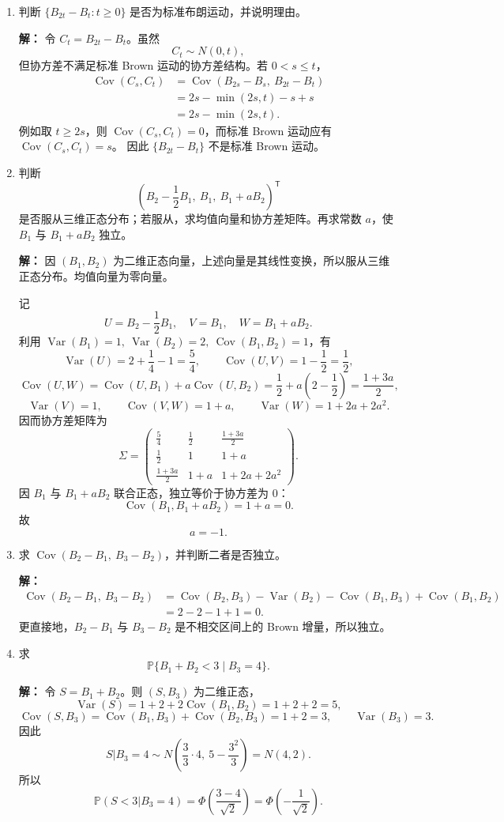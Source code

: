 \documentclass[UTF8,zihao=-4,fontset=windows]{ctexart}
\newcommand{\Prob}{\mathbb P}
\newcommand{\Var}{\operatorname{Var}}
\newcommand{\Cov}{\operatorname{Cov}}
\newcommand{\ans}[1]{\textcolor{ansblue}{\textbf{#1}}}
\begin{document}
\begin{enumerate}
  \item 判断 $\{B_{2t}-B_t:t\ge0\}$ 是否为标准布朗运动，并说明理由。

  \ans{解：} 令 $C_t=B_{2t}-B_t$。虽然
  \[
    C_t\sim N(0,t),
  \]
  但协方差不满足标准 Brown 运动的协方差结构。若 $0<s\le t$，
  \[
  \begin{aligned}
    \Cov(C_s,C_t)
    &=\Cov(B_{2s}-B_s,\ B_{2t}-B_t)\\
    &=2s-\min(2s,t)-s+s\\
    &=2s-\min(2s,t).
  \end{aligned}
  \]
  例如取 $t\ge2s$，则 $\Cov(C_s,C_t)=0$，而标准 Brown 运动应有 $\Cov(C_s,C_t)=s$。
  因此 $\{B_{2t}-B_t\}$ 不是标准 Brown 运动。

  \item 判断
  \[
    \left(B_2-\frac12B_1,\ B_1,\ B_1+aB_2\right)^{\mathsf T}
  \]
  是否服从三维正态分布；若服从，求均值向量和协方差矩阵。再求常数 $a$，使 $B_1$ 与 $B_1+aB_2$ 独立。

  \ans{解：} 因 $(B_1,B_2)$ 为二维正态向量，上述向量是其线性变换，所以服从三维正态分布。均值向量为零向量。

  记
  \[
    U=B_2-\frac12B_1,\quad V=B_1,\quad W=B_1+aB_2.
  \]
  利用 $\Var(B_1)=1,\ \Var(B_2)=2,\ \Cov(B_1,B_2)=1$，有
  \[
    \Var(U)=2+\frac14-1=\frac54,\qquad
    \Cov(U,V)=1-\frac12=\frac12,
  \]
  \[
    \Cov(U,W)=\Cov(U,B_1)+a\Cov(U,B_2)
    =\frac12+a\left(2-\frac12\right)=\frac{1+3a}{2},
  \]
  \[
    \Var(V)=1,\qquad
    \Cov(V,W)=1+a,\qquad
    \Var(W)=1+2a+2a^2.
  \]
  因而协方差矩阵为
  \[
    \Sigma=
    \begin{pmatrix}
      \frac54 & \frac12 & \frac{1+3a}{2}\\[0.3em]
      \frac12 & 1 & 1+a\\[0.3em]
      \frac{1+3a}{2} & 1+a & 1+2a+2a^2
    \end{pmatrix}.
  \]
  因 $B_1$ 与 $B_1+aB_2$ 联合正态，独立等价于协方差为 0：
  \[
    \Cov(B_1,B_1+aB_2)=1+a=0.
  \]
  故
  \[
    \boxed{a=-1.}
  \]

  \item 求 $\Cov(B_2-B_1,\ B_3-B_2)$，并判断二者是否独立。

  \ans{解：}
  \[
  \begin{aligned}
    \Cov(B_2-B_1,\ B_3-B_2)
    &=\Cov(B_2,B_3)-\Var(B_2)-\Cov(B_1,B_3)+\Cov(B_1,B_2)\\
    &=2-2-1+1=0.
  \end{aligned}
  \]
  更直接地，$B_2-B_1$ 与 $B_3-B_2$ 是不相交区间上的 Brown 增量，所以独立。

  \item 求
  \[
    \Prob\{B_1+B_2<3\mid B_3=4\}.
  \]

  \ans{解：} 令 $S=B_1+B_2$。则 $(S,B_3)$ 为二维正态，
  \[
    \Var(S)=1+2+2\Cov(B_1,B_2)=1+2+2=5,
  \]
  \[
    \Cov(S,B_3)=\Cov(B_1,B_3)+\Cov(B_2,B_3)=1+2=3,\qquad
    \Var(B_3)=3.
  \]
  因此
  \[
    S|B_3=4\sim N\left(\frac{3}{3}\cdot4,\ 5-\frac{3^2}{3}\right)=N(4,2).
  \]
  所以
  \[
    \Prob(S<3|B_3=4)
    =\Phi\left(\frac{3-4}{\sqrt2}\right)
    =\Phi\left(-\frac1{\sqrt2}\right).
  \]
\end{enumerate}
\end{document}
